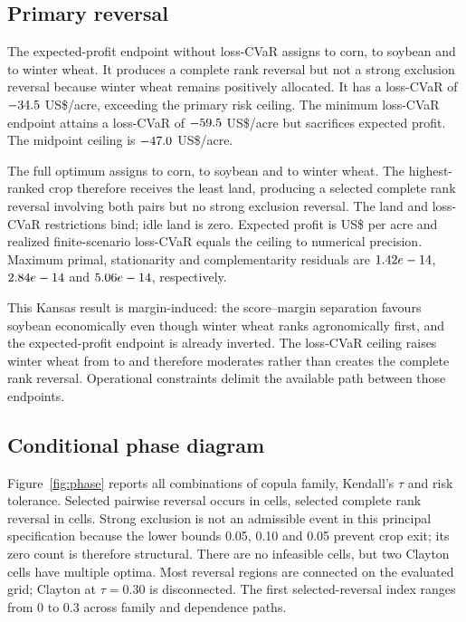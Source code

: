 \subsection{Primary reversal}

The expected-profit endpoint without loss-CVaR assigns \PolicyExpectedCorn{}
to corn, \PolicyExpectedSoy{} to soybean and \PolicyExpectedWheat{} to winter
wheat. It produces a complete rank reversal but not a strong exclusion reversal
because winter wheat remains positively allocated. It has a loss-CVaR of
\(-34.5\) US\$/acre, exceeding the primary risk ceiling.
The minimum loss-CVaR endpoint attains a loss-CVaR of
\(-59.5\) US\$/acre but sacrifices expected profit. The midpoint
ceiling is \(-47.0\) US\$/acre.

The full optimum assigns \PrimaryCorn{} to corn, \PrimarySoy{} to soybean and
\PrimaryWheat{} to winter wheat. The highest-ranked crop therefore receives
the least land, producing a selected complete rank reversal involving both
pairs but no strong exclusion reversal. The land and
loss-CVaR restrictions bind; idle land is zero. Expected profit is
US\$\PrimaryProfit{} per acre and realized finite-scenario
loss-CVaR equals the ceiling to numerical precision. Maximum primal,
stationarity and complementarity residuals are \(1.42e-14\),
\(2.84e-14\) and \(5.06e-14\), respectively.

This Kansas result is margin-induced: the score--margin separation favours
soybean economically even though winter wheat ranks agronomically first, and
the expected-profit endpoint is already inverted. The loss-CVaR ceiling raises
winter wheat from \PolicyExpectedWheat{} to \PrimaryWheat{} and therefore
moderates rather than
creates the complete rank reversal. Operational constraints delimit the available
path between those endpoints.

\subsection{Conditional phase diagram}

Figure~\ref{fig:phase} reports all \PhaseCells{} combinations of copula
family, Kendall's \(\tau\) and risk tolerance. Selected pairwise reversal
occurs in \PhaseReversal{} cells, selected complete rank reversal in
\PhaseComplete{} cells. Strong exclusion is not an admissible event in this
principal specification because the lower bounds 0.05, 0.10 and 0.05 prevent
crop exit; its zero count is therefore structural. There are no infeasible
cells, but two Clayton cells have multiple optima. Most reversal regions are
connected on the evaluated grid; Clayton at \(\tau=0.30\) is disconnected.
The first selected-reversal index ranges from 0 to 0.3 across family and
dependence paths.

